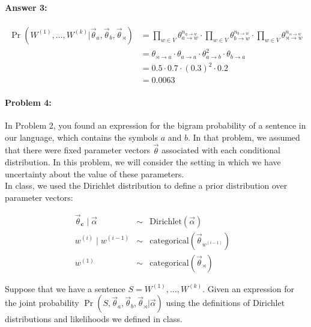 \documentclass[12pt, letterpaper]{article}
\begin{document}
\paragraph{Answer 3:} \begin{align*}
    \Pr(W^{(1)},\dots,W^{(k)} | \vec{\theta}_{a}, \vec{\theta}_{b}, \vec{\theta}_{\rtimes})&=
    \prod_{w\in V} \theta_{a \rightarrow w}^{n_{a \rightarrow w}}\cdot{\prod_{w\in V} \theta_{b \rightarrow w}^{n_{b \rightarrow w}}\cdot{\prod_{w\in V} \theta_{\rtimes \rightarrow w}^{n_{\rtimes \rightarrow w}}}}\\
    &=\theta_{\rtimes \rightarrow a}\cdot{\theta_{a \rightarrow a}\cdot{\theta_{a \rightarrow b}^2\cdot{\theta_{b \rightarrow a}}}}\\
    &= 0.5\cdot{0.7\cdot{(0.3)^{2}\cdot{0.2}}}\\
    &= 0.0063
\end{align*}

\hrulefill
\paragraph{Problem 4:}

In Problem 2, you found an expression for the bigram probability of a
sentence in our language, which contains the symbols $a$ and $b$. In
that problem, we assumed that there were fixed parameter vectors
$\vec{\theta}$ associated with each conditional distribution. In this
problem, we will consider the setting in which we have uncertainty
about the value of these parameters.\\

\noindent In class, we used the Dirichlet distribution to define a
prior distribution over parameter vectors:

\begin{align}
\vec{\theta}_{\mathbf{c}} \mid \vec{\alpha} &\sim& \mathrm{Dirichlet}(\vec{\alpha}) \\
w^{(i)} \mid  w^{(i-1)} &\sim&\mathrm{categorical}(\vec{\theta}_{w^{(i-1)}}) & \\
w^{(1)} &\sim& \mathrm{categorical}(\vec{\theta}_{\rtimes})\ & 
\end{align}

\noindent Suppose that we have a sentence
$S=W^{(1)},\dots,W^{(k)}$. Given an expression for the joint
probability
$\Pr(S, \vec{\theta}_{a}, \vec{\theta}_{b}, \vec{\theta}_{\rtimes} |
\vec{\alpha})$
using the definitions of Dirichlet distributions and likelihoods we
defined in class.
\end{document}
